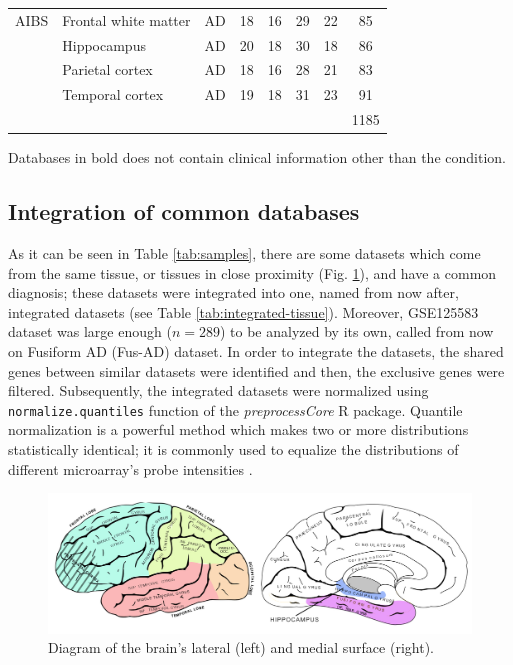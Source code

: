 \begin{table}[!ht]
\begin{tabular}{llcccccc}
AIBS \cite{AIBS} & Frontal white matter   & AD & 18 & 16 & 29 & 22  & 85\\
                                                   & Hippocampus              & AD & 20 & 18 & 30 & 18  & 86                   \\
                                                   & Parietal   cortex        & AD & 18 & 16 & 28 & 21  & 83                   \\
                                                   & Temporal   cortex        & AD & 19 & 18 & 31 & 23  & 91                   \\ \cline{8-8}  
  &   &   &   &   &   &   &   1185\\                                   
\hline
\end{tabular}
\footnotesize Databases in bold does not contain clinical information other than the condition.

\end{table}

\subsection{Integration of common databases} \label{integration-method}

As it can be seen in Table \ref{tab:samples}, there are some datasets which come from the same tissue, or tissues in close proximity (Fig. \ref{fig:brain}), and have a common diagnosis; these datasets were integrated into one, named from now after, integrated datasets (see Table \ref{tab:integrated-tissue}). Moreover, GSE125583 dataset was large enough ($n=289$) to be analyzed by its own, called from now on Fusiform AD (Fus-AD) dataset. In order to integrate the datasets, the shared genes between similar datasets were identified and then, the exclusive genes were filtered. Subsequently, the integrated datasets were normalized using \verb|normalize.quantiles| function of the \textit{preprocessCore} R package. Quantile normalization is a powerful method which makes two or more distributions statistically identical; it is commonly used to equalize the distributions of different microarray's probe intensities \cite{bolstad}.

\begin{figure}[ht]
    \centerline{\includegraphics[width = 15cm]{Figures/brain.jpg}}
\caption{Diagram of the brain's lateral (left) and medial surface (right).}
\label{fig:brain}
\end{figure}

